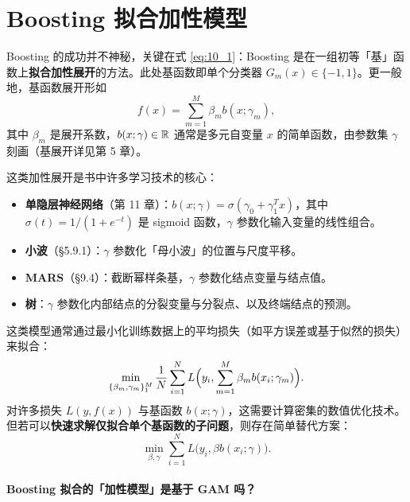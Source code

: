 \section{Boosting 拟合加性模型}

Boosting 的成功并不神秘，关键在式 \eqref{eq:10_1}：Boosting 是在一组初等「基」函数上\textbf{拟合加性展开}的方法。此处基函数即单个分类器 $G_m(x) \in \{-1, 1\}$。更一般地，基函数展开形如
\begin{equation}\label{eq:10_3}
    f(x) = \sum_{m=1}^{M} \beta_m b(x; \gamma_m),
\end{equation}
其中 $\beta_m$ 是展开系数，$b(x; \gamma) \in \mathbb{R}$ 通常是多元自变量 $x$ 的简单函数，由参数集 $\gamma$ 刻画（基展开详见第 5 章）。

这类加性展开是书中许多学习技术的核心：
\begin{itemize}
    \item \textbf{单隐层神经网络}（第 11 章）：$b(x; \gamma) = \sigma(\gamma_0 + \gamma_1^T x)$，其中 $\sigma(t) = 1/(1 + e^{-t})$ 是 sigmoid 函数，$\gamma$ 参数化输入变量的线性组合。
    \item \textbf{小波}（§5.9.1）：$\gamma$ 参数化「母小波」的位置与尺度平移。
    \item \textbf{MARS}（§9.4）：截断幂样条基，$\gamma$ 参数化结点变量与结点值。
    \item \textbf{树}：$\gamma$ 参数化内部结点的分裂变量与分裂点、以及终端结点的预测。
\end{itemize}

这类模型通常通过最小化训练数据上的平均损失（如平方误差或基于似然的损失）来拟合：
\begin{equation}\label{eq:10_4}
    \min_{\{\beta_m, \gamma_m\}_1^M} \frac{1}{N}\sum_{i=1}^{N} L\Bigl(y_i, \sum_{m=1}^{M} \beta_m b(x_i; \gamma_m)\Bigr).
\end{equation}
对许多损失 $L(y, f(x))$ 与基函数 $b(x; \gamma)$，这需要计算密集的数值优化技术。但若可以\textbf{快速求解仅拟合单个基函数的子问题}，则存在简单替代方案：
\begin{equation}\label{eq:10_5}
    \min_{\beta, \gamma} \sum_{i=1}^{N} L\bigl(y_i, \beta b(x_i; \gamma)\bigr).
\end{equation}

\paragraph{Boosting 拟合的「加性模型」是基于 GAM 吗？}

